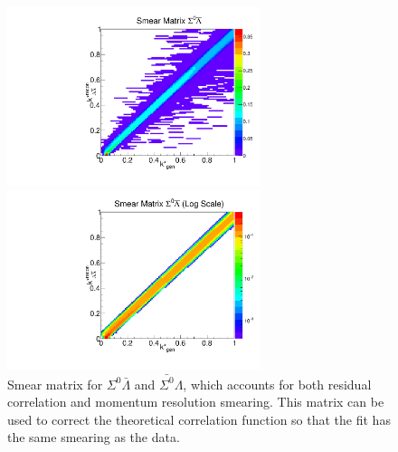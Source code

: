 \begin{figure}[ht]
\begin{minipage}{17.5pc}
\includegraphics[width=17.5pc]{Figures/SmearMatrices/2016-7-19-SmearMatrixSigmaLambdaNormLA.pdf}
\end{minipage}\hspace{0.5pc}
\begin{minipage}{17.5pc}
\includegraphics[width=17.5pc]{Figures/SmearMatrices/2016-7-19-SmearMatrixSigmaLambdaNormLALog.pdf}
\end{minipage} 
\caption[Smear matrix -- $\Sigma^0\bar{\Lambda}$ and $\bar{\Sigma^0}\Lambda$]{
Smear matrix for $\Sigma^0\bar{\Lambda}$ and $\bar{\Sigma^0}\Lambda$, which accounts for both residual correlation and momentum resolution smearing. This matrix can be used to correct the theoretical correlation function so that the fit has the same smearing as the data.
}
\end{figure}


